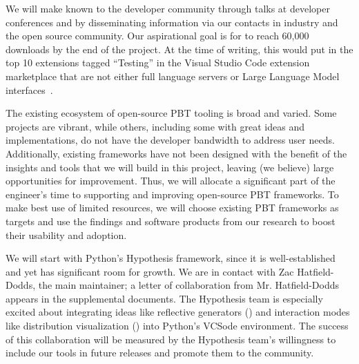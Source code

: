 We will make \tyche{} known to the developer community through talks at developer
conferences and by
disseminating information via our contacts in industry and the open source
community.
%
Our aspirational goal is for \tyche{} to reach 60,000 downloads by the end of the
project. At
the time of writing, this would put \tyche{} in the top 10 extensions
tagged ``Testing'' in the Visual Studio Code extension marketplace
that are not either full language servers or Large
Language Model interfaces~\cite{noauthor_testing_nodate}.


The existing ecosystem of open-source PBT tooling is broad and varied. Some
projects are vibrant, while others, including some with
great ideas and implementations, do not have the developer bandwidth to address
user needs. Additionally, existing frameworks have not been designed with
the benefit of the insights and tools that we will build in this
project, leaving (we believe) large opportunities for improvement.
Thus, we will allocate a significant part of the engineer's time to
supporting and improving open-source PBT frameworks.
%
To make best use of limited resources, we will choose existing PBT
frameworks as targets and use the findings and software products from
our research to boost their usability and adoption.

We will start
with Python's Hypothesis framework, since it is well-established and yet has
significant room for growth.  We are in contact with Zac Hatfield-Dodds, the
main maintainer; a letter of collaboration from Mr.{}
Hatfield-Dodds appears in the supplemental documents. The Hypothesis team is
especially excited about integrating ideas like reflective generators
() and interaction modes like distribution
visualization () into Python's VCSode environment.
The success of this collaboration will be measured by the Hypothesis team's
willingness to include our tools in future releases and promote them to the
community.

